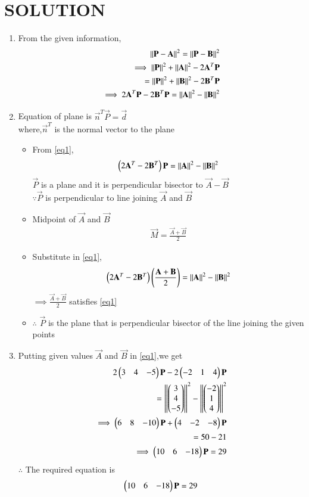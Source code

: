 \documentclass[journal,12pt,twocolumn]{IEEEtran}
\begin{document}
\section{SOLUTION} 
\begin{enumerate}
\item From the given information,
\begin{align}
\left\lVert\mathbf{P}-\mathbf{A}\right\rVert^2=\left\lVert\mathbf{P}-\mathbf{B}\right\rVert^2
\\
\implies\left\lVert\mathbf{P}\right\rVert^2+\left\lVert\mathbf{A}\right\rVert^2-2\mathbf{A}^T\mathbf{P}
\\
=\left\lVert\mathbf{P}\right\rVert^2+\left\lVert\mathbf{B}\right\rVert^2-2\mathbf{B}^T\mathbf{P}
\\
\implies 2\mathbf{A}^T\mathbf{P}-2\mathbf{B}^T\mathbf{P}=\left\lVert\mathbf{A}\right\rVert^2-\left\lVert\mathbf{B}\right\rVert^2  \label{eq1}
\end{align}
\item Equation of plane is $\vec{n}^T\vec{P}=\vec{d}$
\\
where,$\vec{n}^T$ is the normal vector to the plane 
\begin{itemize}
\item From \eqref{eq1},
\begin{align}
\begin{pmatrix}2\mathbf{A}^T-2\mathbf{B}^T\end{pmatrix}\mathbf{P}=\left\lVert\mathbf{A}\right\rVert^2-\left\lVert\mathbf{B}\right\rVert^2
\end{align}
$\vec{P}$ is a plane and it is perpendicular bisector to $\vec{A}-\vec{B}$
\\
$\because\vec{P}$ is perpendicular to line joining $\vec{A}$ and $\vec{B}$
\item Midpoint of $\vec{A}$ and $\vec{B}$
\begin{align}
\vec{M}= \frac{\vec{A}+\vec{B}}{2}
\end{align}
\item Substitute in \eqref{eq1},
\begin{align}
\begin{pmatrix}2\mathbf{A}^T-2\mathbf{B}^T\end{pmatrix}\left(\frac{\mathbf{A}+\mathbf{B}}{2}\right)=\left\lVert\mathbf{A}\right\rVert^2-\left\lVert\mathbf{B}\right\rVert^2 
\end{align}
$\implies \frac{\vec{A}+\vec{B}}{2}$ satisfies \eqref{eq1}
\item $\therefore$ $\vec{P}$ is the plane that is perpendicular bisector of the line joining the given points 
\end{itemize}
\item Putting given values $\vec{A}$ and $\vec{B}$ in \eqref{eq1},we get 
\begin{align}
2\begin{pmatrix}3 & 4 & -5\end{pmatrix}\mathbf{P}-2\begin{pmatrix}-2 & 1 & 4\end{pmatrix}\mathbf{P}
\\
=\left\lVert\begin{pmatrix}3\\4\\-5\end{pmatrix}\right\rVert^2-\left\lVert\begin{pmatrix}-2\\1\\4\end{pmatrix}\right\rVert^2
\\
\implies\begin{pmatrix}6 & 8 & -10\end{pmatrix}\mathbf{P}+\begin{pmatrix}4 & -2 & -8\end{pmatrix}\mathbf{P} 
\\
=50-21
\\
\implies\begin{pmatrix}10 & 6 & -18\end{pmatrix}\mathbf{P}=29
\end{align}
$\therefore$ The required equation is
\begin{align}
\begin{pmatrix}10 & 6 & -18\end{pmatrix}\mathbf{P}=29
\end{align}
\end{enumerate}
\end{document}
